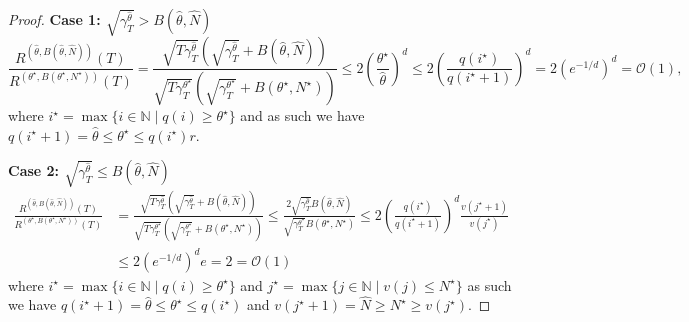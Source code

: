 \documentclass{article}
\theoremstyle{plain}
\theoremstyle{definition}
\theoremstyle{remark}
\theoremstyle{plain}
\begin{document}
\begin{proof}
\textbf{Case 1: $\sqrt{\gamma_T^{\hat{\theta}}} > B(\hat{\theta}, \hat{N})$}
    \begin{equation*}
        \frac{R^{(\hat{\theta}, B(\hat{\theta}, \hat{N}))}(T)}{R^{(\theta^\star, B(\theta^\star, N^\star))}(T)} = \frac{ \sqrt{T\gamma_T^{\hat{\theta}}} \left( \sqrt{\gamma_T^{\hat{\theta}}} + B(\hat{\theta}, \hat{N}) \right)}{ \sqrt{T\gamma_T^{\theta^\star}} \left( \sqrt{\gamma_T^{\theta^\star}} + B(\theta^\star, N^\star) \right)} \le  2\left(\frac{\theta^\star}{\hat{\theta}}\right)^{d} \le  2\left(\frac{q(i^\star)}{q(i^\star + 1)}\right)^{d} = 2\left(e^{-1/d}\right)^{d} = \mathcal{O}(1),
    \end{equation*}
    where $i^\star = \max \{ i \in \mathbb{N} \mid q(i) \ge \theta^\star \}$ and as such we have $q(i^\star + 1) = \hat{\theta} \le \theta^\star \le  q(i^\star) r$.

\textbf{Case 2: $\sqrt{\gamma_T^{\hat{\theta}}} \le B(\hat{\theta}, \hat{N})$}
\begin{align*}
        \frac{R^{(\hat{\theta}, B(\hat{\theta}, \hat{N}))}(T)}{R^{(\theta^\star, B(\theta^\star, N^\star))}(T)} &= \frac{ \sqrt{T\gamma_T^{\hat{\theta}}} \left( \sqrt{\gamma_T^{\hat{\theta}}} + B(\hat{\theta}, \hat{N}) \right)}{\sqrt{T\gamma_T^{\theta^\star}} \left( \sqrt{\gamma_T^{\theta^\star}} + B(\theta^\star, N^\star) \right)} \le  \frac{2  \sqrt{\gamma_T^{\hat{\theta}}} B(\hat{\theta}, \hat{N}) }{\sqrt{\gamma_T^{\theta^\star}}  B(\theta^\star, N^\star)} \le 2\left(\frac{q(i^\star)}{q(i^\star + 1)}\right)^{d} \frac{v(j^\star+1)}{v(j^\star)} \\
        &\le 2\left(e^{-1/d}\right)^{d} e = 2 = \mathcal{O}(1)
    \end{align*}
    where $i^\star = \max \{ i \in \mathbb{N} \mid q(i) \ge \theta^\star \}$ and $j^\star = \max \{ j \in \mathbb{N} \mid  v(j) \le N^\star   \}$ as such we have $q(i^\star + 1) = \hat{\theta} \le \theta^\star \le  q(i^\star) $ and $v(j^\star + 1) = \hat{N} \ge  N^\star \ge v(j^\star)$.
\end{proof}
\end{document}
